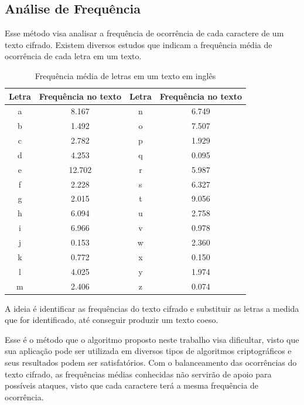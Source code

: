 \subsection{Análise de Frequência}
\label{frequency-analysis}

Esse método visa analisar a frequência de ocorrência de cada caractere de um texto cifrado. Existem diversos estudos que indicam a frequência média de ocorrência de cada letra em um texto. 

\begin{table}[h]
\centering
\begin{tabular}{ c c | c c }
\toprule
	Letra & Frequência no texto & Letra & Frequência no texto \\ \hline
	a & 8.167 & n & 6.749 \\ \hline
	b & 1.492 & o & 7.507 \\ \hline
	c & 2.782 & p & 1.929 \\ \hline
	d & 4.253 & q & 0.095 \\ \hline
	e & 12.702 & r & 5.987 \\ \hline
	f & 2.228 & s & 6.327 \\ \hline
	g & 2.015 & t & 9.056 \\ \hline
	h & 6.094 & u & 2.758 \\ \hline
	i & 6.966 & v & 0.978 \\ \hline
	j & 0.153 & w & 2.360 \\ \hline
	k & 0.772 & x & 0.150 \\ \hline
	l & 4.025 & y & 1.974 \\ \hline
	m & 2.406 & z & 0.074 \\ \hline
\end{tabular}
\caption[{Frequência média de letras em um texto em inglês}]{Frequência média de letras em um texto em inglês \cite{robert-lewand}} 
\end{table}

A ideia é identificar as frequências do texto cifrado e substituir as letras a medida que for identificado, até conseguir produzir um texto coeso.

Esse é o método que o algoritmo proposto neste trabalho visa dificultar, visto que sua aplicação pode ser utilizada em diversos tipos de algoritmos criptográficos e seus resultados podem ser satisfatórios. Com o balanceamento das ocorrências do texto cifrado, as frequências médias conhecidas não servirão de apoio para possíveis ataques, visto que cada caractere terá a mesma frequência de ocorrência.